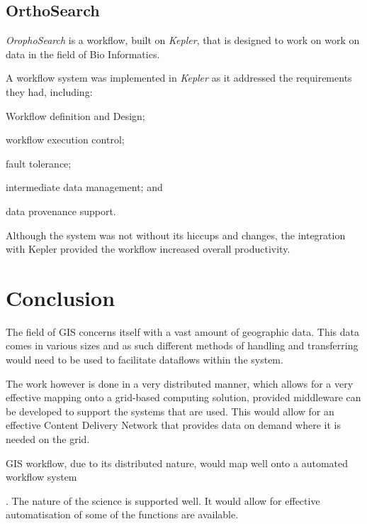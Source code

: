\documentclass[11pt,twocolumn]{article}
\begin{document}
    \subsection*{OrthoSearch}
      \emph{OrophoSearch} is a workflow,
      built on \emph{Kepler}, that is designed to work on
      work on data in the field of Bio Informatics.
      \cite{daCruz:2008:OSW:1363686.1363983}

      A workflow system was implemented in \emph{Kepler}
      as it addressed the requirements they had,
      including: \begin{inparaenum}[(i)]
      \item Workflow definition and Design; \item workflow execution
      control; \item fault tolerance; \item intermediate
      data management; and \item data provenance support.
      \end{inparaenum}

      Although the system was not without its hiccups and changes,
      the integration with Kepler provided the workflow
      increased overall productivity.


\section{Conclusion}
   The field of GIS concerns itself with a vast amount of geographic
   data. This data comes in various sizes and as such different
   methods of handling and transferring would need to be used to
   facilitate dataflows within the system.

   The work however is done in a very distributed manner, which allows
   for a very effective mapping onto a grid-based computing solution,
   provided middleware can be developed to support the systems that
   are used\cite{Montella:2007:UGC:1272980.1272995}. This would
   allow for an  effective Content Delivery Network
   that provides data on demand where it is needed on the grid.

   GIS workflow, due to its distributed nature, would map
   well onto a automated workflow system

   \cite{Withana:2010:VWE:1851476.1851586}. The nature of the science
   is supported well. It would allow for effective automatisation
   of some of the functions are available.


{}

\end{document}
